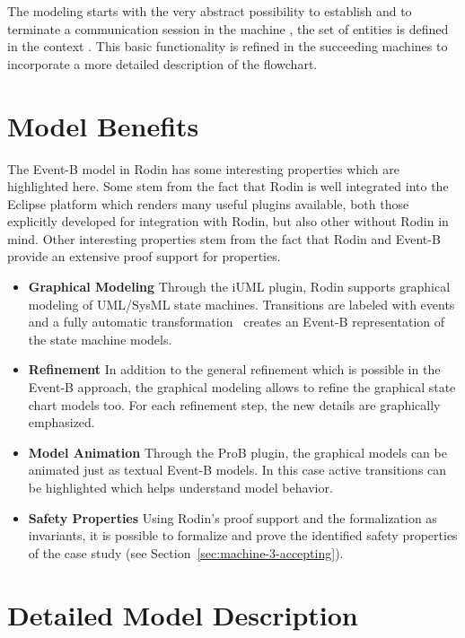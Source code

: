 \documentclass{template/openetcs_article}
\begin{document}
The modeling starts with the very abstract possibility to establish and to
terminate a communication session in the machine , the set of
entities is defined in the context . This basic functionality is
refined in the succeeding machines to incorporate a more detailed description of
the flowchart.

\section{Model Benefits}
\label{sec:model-highlights}

The Event-B model in Rodin has some interesting properties which are highlighted
here. Some stem from the fact that Rodin is well integrated into the Eclipse
platform which renders many useful plugins available, both those explicitly
developed for integration with Rodin, but also other without Rodin in mind.
Other interesting properties stem from the fact that Rodin and Event-B provide
an extensive proof support for properties.

\begin{itemize}
\item {\bf Graphical Modeling} Through the iUML plugin, Rodin supports graphical
  modeling of UML/SysML state machines. Transitions are labeled with events and
  a fully automatic transformation~\cite{said2009language} creates an Event-B
  representation of the state machine models.
\item {\bf Refinement} In addition to the general refinement which is possible
  in the Event-B approach, the graphical modeling allows to refine the graphical
  state chart models too. For each refinement step, the new details are
  graphically emphasized.
\item {\bf Model Animation} Through the ProB plugin, the graphical models can be
  animated just as textual Event-B models. In this case active transitions can
  be highlighted which helps understand model behavior.
\item {\bf Safety Properties} Using Rodin's proof support and the formalization
  as invariants, it is possible to formalize and prove the identified safety
  properties of the case study (see Section~\ref{sec:machine-3-accepting}).
\end{itemize}

\section{Detailed Model Description}
\label{sec:deta-model-descr}
\end{document}
